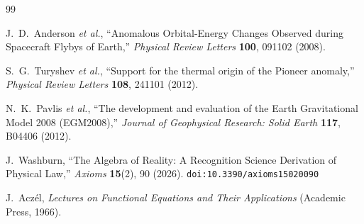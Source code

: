 \documentclass[12pt,a4paper]{article}
\theoremstyle{definition}
\theoremstyle{remark}
\begin{document}
\begin{thebibliography}{99}

J.~D.~Anderson \textit{et al.}, ``Anomalous Orbital-Energy Changes
Observed during Spacecraft Flybys of Earth,'' \emph{Physical Review
Letters} \textbf{100}, 091102 (2008).

S.~G.~Turyshev \textit{et al.}, ``Support for the thermal origin of the
Pioneer anomaly,'' \emph{Physical Review Letters} \textbf{108}, 241101
(2012).

N.~K.~Pavlis \textit{et al.}, ``The development and evaluation of the
Earth Gravitational Model 2008 (EGM2008),'' \emph{Journal of Geophysical
Research: Solid Earth} \textbf{117}, B04406 (2012).

J.~Washburn, ``The Algebra of Reality: A Recognition Science Derivation
of Physical Law,'' \emph{Axioms} \textbf{15}(2), 90 (2026).
\texttt{doi:10.3390/axioms15020090}

J.~Acz\'el, \emph{Lectures on Functional Equations and Their
Applications} (Academic Press, 1966).

\end{thebibliography}
\end{document}
